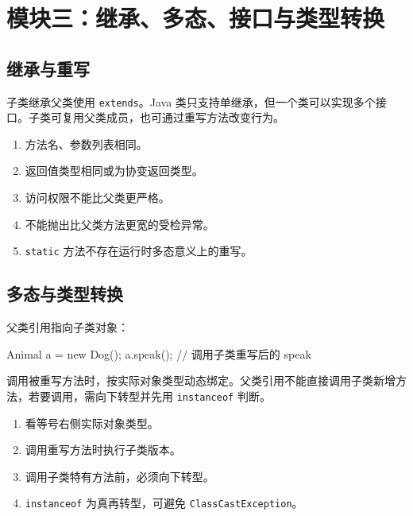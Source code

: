 \documentclass[UTF8,zihao=-4]{ctexart}
\begin{document}
\section{模块三：继承、多态、接口与类型转换}

\subsection{继承与重写}
\begin{keybox}[继承]
子类继承父类使用 \texttt{extends}。Java 类只支持单继承，但一个类可以实现多个接口。子类可复用父类成员，也可通过重写方法改变行为。
\end{keybox}

\begin{methodbox}[方法重写规则]
\begin{enumerate}
  \item 方法名、参数列表相同。
  \item 返回值类型相同或为协变返回类型。
  \item 访问权限不能比父类更严格。
  \item 不能抛出比父类方法更宽的受检异常。
  \item \texttt{static} 方法不存在运行时多态意义上的重写。
\end{enumerate}
\end{methodbox}

\subsection{多态与类型转换}
\begin{keybox}[多态]
父类引用指向子类对象：
\begin{Code}
Animal a = new Dog();
a.speak();  // 调用子类重写后的 speak
\end{Code}
调用被重写方法时，按实际对象类型动态绑定。父类引用不能直接调用子类新增方法，若要调用，需向下转型并先用 \texttt{instanceof} 判断。
\end{keybox}

\begin{methodbox}
\begin{enumerate}
  \item 看等号右侧实际对象类型。
  \item 调用重写方法时执行子类版本。
  \item 调用子类特有方法前，必须向下转型。
  \item \texttt{instanceof} 为真再转型，可避免 \texttt{ClassCastException}。
\end{enumerate}
\end{methodbox}
\end{document}
